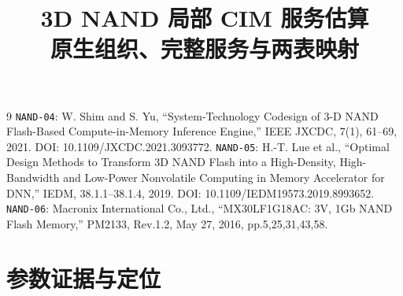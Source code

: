 \documentclass[11pt,a4paper,fontset=fandol]{ctexart}
\title{\bfseries 3D NAND 局部 CIM 服务估算\\[4pt]\large 原生组织、完整服务与两表映射}
\author{}\date{}
\begin{document}
\maketitle\vspace{-2.5em}


\begin{thebibliography}{9}
\texttt{NAND-04}: W. Shim and S. Yu, ``System-Technology Codesign of 3-D NAND Flash-Based Compute-in-Memory Inference Engine,'' IEEE JXCDC, 7(1), 61--69, 2021. DOI: 10.1109/JXCDC.2021.3093772.
\texttt{NAND-05}: H.-T. Lue et al., ``Optimal Design Methods to Transform 3D NAND Flash into a High-Density, High-Bandwidth and Low-Power Nonvolatile Computing in Memory Accelerator for DNN,'' IEDM, 38.1.1--38.1.4, 2019. DOI: 10.1109/IEDM19573.2019.8993652.
\texttt{NAND-06}: Macronix International Co., Ltd., ``MX30LF1G18AC: 3V, 1Gb NAND Flash Memory,'' PM2133, Rev.1.2, May 27, 2016, pp.5,25,31,43,58.
\end{thebibliography}
\clearpage
\section*{参数证据与定位}

\end{document}
